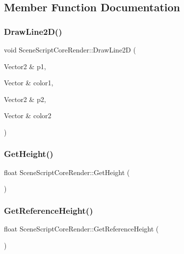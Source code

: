 \subsection{Member Function Documentation}
\hypertarget{class_scene_script_core_render_acadb3e717da0cdacf709a4d80c91c906}{}\label{class_scene_script_core_render_acadb3e717da0cdacf709a4d80c91c906} 
\subsubsection{\texorpdfstring{Draw\+Line2\+D()}{DrawLine2D()}}
{\footnotesize\ttfamily void Scene\+Script\+Core\+Render\+::\+Draw\+Line2D (\begin{DoxyParamCaption}\item[{Vector2 \&}]{p1,  }\item[{Vector \&}]{color1,  }\item[{Vector2 \&}]{p2,  }\item[{Vector \&}]{color2 }\end{DoxyParamCaption})}

\hypertarget{class_scene_script_core_render_a5e51f6aa9b08fd6a596f63c4628cd6cb}{}\label{class_scene_script_core_render_a5e51f6aa9b08fd6a596f63c4628cd6cb} 
\subsubsection{\texorpdfstring{Get\+Height()}{GetHeight()}}
{\footnotesize\ttfamily float Scene\+Script\+Core\+Render\+::\+Get\+Height (\begin{DoxyParamCaption}{ }\end{DoxyParamCaption})}

\hypertarget{class_scene_script_core_render_a32bda5ccbd1e51a85f8ad06b0ceb6cdf}{}\label{class_scene_script_core_render_a32bda5ccbd1e51a85f8ad06b0ceb6cdf} 
\subsubsection{\texorpdfstring{Get\+Reference\+Height()}{GetReferenceHeight()}}
{\footnotesize\ttfamily float Scene\+Script\+Core\+Render\+::\+Get\+Reference\+Height (\begin{DoxyParamCaption}{ }\end{DoxyParamCaption})}

